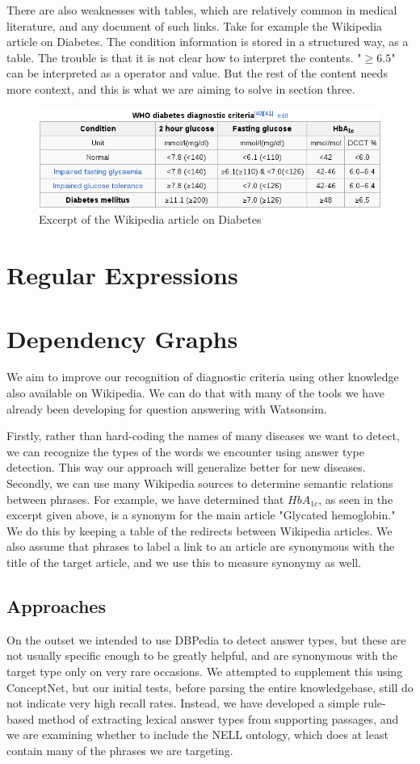 \documentclass[12pt,letterpaper]{article}
\begin{document}
There are also weaknesses with tables, which are relatively common in medical literature, and any document of such links. Take for example the Wikipedia article on Diabetes. The condition information is stored in a structured way, as a table. The trouble is that it is not clear how to interpret the contents. "$\geq 6.5$" can be interpreted as a operator and value. But the rest of the content needs more context, and this is what we are aiming to solve in section three.
\begin{figure}
\includegraphics[width=\textwidth]{WikipediaA1CTable}
\caption{Excerpt of the Wikipedia article on Diabetes}
\end{figure}
\section{Regular Expressions}
\section{Dependency Graphs}
We aim to improve our recognition of diagnostic criteria using other knowledge also available on Wikipedia. We can do that with many of the tools we have already been developing for question answering with Watsonsim.

Firstly, rather than hard-coding the names of many diseases we want to detect, we can recognize the types of the words we encounter using answer type detection. This way our approach will generalize better for new diseases.
Secondly, we can use many Wikipedia sources to determine semantic relations between phrases. For example, we have determined that $HbA_{1c}$, as seen in the excerpt given above, is a synonym for the main article "Glycated hemoglobin." We do this by keeping a table of the redirects between Wikipedia articles. We also assume that phrases to label a link to an article are synonymous with the title of the target article, and we use this to measure synonymy as well.

\subsection{Approaches}
On the outset we intended to use DBPedia to detect answer types, but these are not usually specific enough to be greatly helpful, and are synonymous with the target type only on very rare occasions. We attempted to supplement this using ConceptNet, but our initial tests, before parsing the entire knowledgebase, still do not indicate very high recall rates. Instead, we have developed a simple rule-based method of extracting lexical answer types from supporting passages, and we are examining whether to include the NELL ontology, which does at least contain many of the phrases we are targeting.
\end{document}

